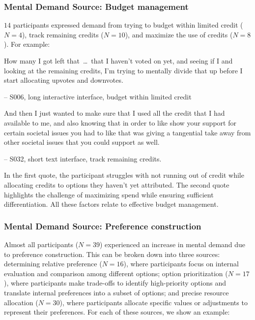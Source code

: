 \subsubsection{Mental Demand Source: Budget management} $14$ participants expressed demand from trying to budget within limited credit ($N=4$), track remaining credits ($N=10$), and maximize the use of credits ($N=8$). For example:

\begin{displayquote}
How many I got left that~\ldots\ that I haven't voted on yet, and seeing if I and looking at the remaining credits, I'm trying to mentally divide that up before I start allocating upvotes and downvotes.

\small{\noindent \hfill -- S006, long interactive interface, budget within limited credit}
\end{displayquote}

\begin{displayquote}
And then I just wanted to make sure that I used all the credit that I had available to me, and also knowing that in order to like show your support for certain societal issues you had to like that was giving a tangential take away from other societal issues that you could support as well.
    
\noindent \hfill -- S032, short text interface, track remaining credits.
\end{displayquote}

In the first quote, the participant struggles with not running out of credit while allocating credits to options they haven't yet attributed. The second quote highlights the challenge of maximizing spend while ensuring sufficient differentiation. All these factors relate to effective budget management.

\subsubsection{Mental Demand Source: Preference construction} Almost all participants ($N=39$) experienced an increase in mental demand due to preference construction. This can be broken down into three sources: determining relative preference ($N=16$), where participants focus on internal evaluation and comparison among different options; option prioritization ($N=17$),  where participants make trade-offs to identify high-priority options and translate internal preferences into a subset of options; and precise resource allocation ($N=30$), where participants allocate specific values or adjustments to represent their preferences. For each of these sources, we show an example:

